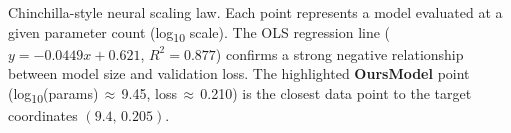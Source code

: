 \caption{Chinchilla-style neural scaling law. Each point represents a model evaluated at a given parameter count (log\textsubscript{10} scale). The OLS regression line ($y = -0.0449x + 0.621$, $R^2 = 0.877$) confirms a strong negative relationship between model size and validation loss. The highlighted \textbf{OursModel} point (log\textsubscript{10}(params)\,$\approx$\,9.45, loss\,$\approx$\,0.210) is the closest data point to the target coordinates $(9.4,\,0.205)$.}
